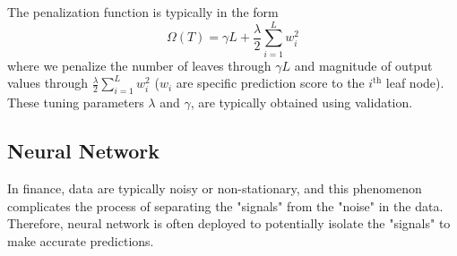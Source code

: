 \documentclass[oneside, 12pt]{article}
\newcommand*{\1}{\text{\scalebox{1.1}{\usefont{U}{bbold}{m}{n}1}}}
\begin{document}
The penalization function is typically in the form 
$$
\Omega(T) = \gamma L + \frac{\lambda}{2} \sum_{i = 1}^L w_i^2
$$
where we penalize the number of leaves through $\gamma L$ and magnitude of output values through $\frac{\lambda}{2}\sum\limits_{i = 1}^L w_i^2$ ($w_i$ are specific prediction score to the $i^{\text{th}}$ leaf node). These tuning parameters $\lambda$ and $\gamma$, are typically obtained using validation. 

\subsection{Neural Network}
In finance, data are typically noisy or non-stationary, and this phenomenon complicates the process of separating the "signals" from the "noise" in the data. Therefore, neural network is often deployed to potentially isolate the "signals" to make accurate predictions.  
\end{document}
